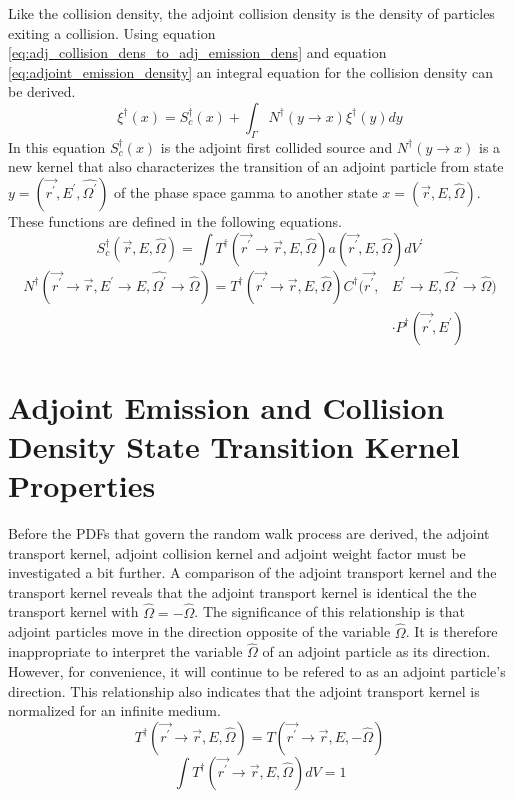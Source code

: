 Like the collision density, the adjoint collision density is the density of
particles exiting a collision. Using equation 
\ref{eq:adj_collision_dens_to_adj_emission_dens} and equation 
\ref{eq:adjoint_emission_density} an integral equation for the collision 
density can be derived.
\begin{equation}
  \xi^{\dagger}(x) = S_c^{\dagger}(x) + \int_{\Gamma} N^{\dagger}(y \to x)
  \xi^{\dagger}(y) dy
\end{equation}
In this equation $S_c^{\dagger}(x)$ is the adjoint first collided source and
$N^{\dagger}(y \to x)$ is a new kernel that also characterizes the transition
of an adjoint particle from state $y = (\vec{r^{'}},E^{'},\hat{\Omega^{'}})$ of
the phase space gamma to another state $x = (\vec{r},E,\hat{\Omega})$. These
functions are defined in the following equations.
\begin{equation}
  S_c^{\dagger}(\vec{r},E,\hat{\Omega}) = \int 
  T^{\dagger}(\vec{r^{'}} \to \vec{r},E,\hat{\Omega}) a(\vec{r^{'}},E,\hat{\Omega})
  dV^{'}
\end{equation}
\begin{equation}
  \begin{split}
    N^{\dagger}(\vec{r^{'}} \to \vec{r},E^{'} \to E,\hat{\Omega^{'}} \to \hat{\Omega})
    = T^{\dagger}(\vec{r^{'}} \to \vec{r},E,\hat{\Omega})
    C^{\dagger}(\vec{r^{'}},&E^{'} \to E,\hat{\Omega^{'}} \to \hat{\Omega}) \\
    & \cdot P^{\dagger}(\vec{r^{'}},E^{'}) 
  \end{split}
\end{equation}

\section{Adjoint Emission and Collision Density State Transition Kernel Properties}
Before the PDFs that govern the random walk process are derived, the adjoint
transport kernel, adjoint collision kernel and adjoint weight factor must be 
investigated a bit further. A comparison of the adjoint transport kernel and 
the transport kernel reveals that the adjoint transport kernel is identical 
the the transport kernel with $\hat{\Omega} = -\hat{\Omega}$. The significance 
of this relationship is that adjoint particles move in the direction opposite 
of the variable $\hat{\Omega}$. It is therefore inappropriate to interpret the 
variable $\hat{\Omega}$ of an adjoint particle as its direction. However, for 
convenience, it will continue to be refered to as an adjoint particle's 
direction. This relationship also indicates that the adjoint transport kernel
is normalized for an infinite medium.
\begin{equation}
  T^{\dagger}(\vec{r^{'}} \to \vec{r},E,\hat{\Omega}) = 
  T(\vec{r^{'}} \to \vec{r},E,-\hat{\Omega}) 
\end{equation}
\begin{equation}
  \int T^{\dagger}(\vec{r^{'}} \to \vec{r},E,\hat{\Omega}) dV = 1
\end{equation}

